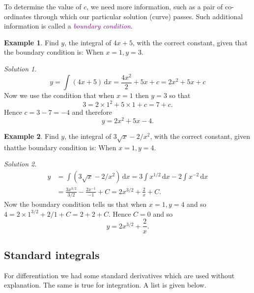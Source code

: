 \documentclass[
  english,
  11pt,
  oneside]{book}
\newcommand{\slide}{}
\theoremstyle{definition}
\theoremstyle{definition}
\newtheorem{example}{Example}[chapter]
\theoremstyle{definition}
\theoremstyle{definition}
\theoremstyle{remark}
\newtheorem*{solution}{Solution}
\begin{document}
To determine the value of \(c\), we need more information, such as a pair of co-ordinates through which our particular solution (curve) passes. Such additional information is called a \textcolor{purple}{\em boundary condition}.

\slide

\begin{example}
Find \(y\), the integral of \(4x + 5\), with the correct constant, given that the boundary condition is:
When \(x = 1, y = 3\).
\end{example}

\begin{solution}
\[
y = \int(4x+5)\,\mathrm{d}x = \frac{4x^2}{2} + 5x+c = 2x^2+5x+c
\]
Now we use the condition that when \(x=1\) then \(y=3\) so that
\[
3 = 2\times 1^2 + 5\times1 + c = 7+c.
\]
Hence \(c = 3-7=-4\) and therefore
\[
y = 2x^2+5x-4.
\]
\end{solution}

\slide

\begin{example}
Find \(y\), the integral of \(3\sqrt{x} - 2/x^2\), with the correct constant, given thatthe boundary condition is:
When \(x = 1, y = 4\).
\end{example}

\begin{solution}
\begin{align*}
y& = \int(3\sqrt{x}-2/x^2)\,\mathrm{d}x = 3\int x^{1/2}\,\mathrm{d}x - 2\int x^{-2}\,\mathrm{d}x\\
&= \frac{3x^{3/2}}{3/2} - \frac{2x^{-1}}{-1}+C = 2x^{3/2}+\frac2x+C.
\end{align*}
Now the boundary condition tells us that when \(x=1, y = 4\) and so \(4=2\times1^{3/2}+2/1+C = 2+2+C\). Hence \(C=0\) and so
\[
y = 2x^{3/2}+\frac 2x.
\]
\end{solution}

\slide

\subsection{Standard integrals}\label{standard-integrals}

For differentiation we had some standard derivatives which are used without explanation. The same is true for integration. A list is given below.

\slide
\end{document}
